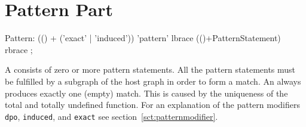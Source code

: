 \section{Pattern Part}
\label{patternpart}
\begin{rail}
  Pattern: (() + ('exact' | 'induced')) 'pattern' lbrace (()+PatternStatement) rbrace ;
\end{rail}
A  consists of zero or more pattern statements. 
All the pattern statements must be fulfilled by a subgraph of the host graph in order to form a match. 
An  always produces exactly one (empty) match. 
This is caused by the uniqueness of the total and totally undefined function.
For an explanation of the pattern modifiers \texttt{dpo}, \texttt{induced}, and \texttt{exact} see section~\ref{sct:patternmodifier}.

